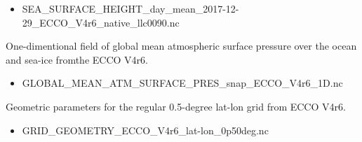 \begin{itemize}
    \item SEA\_SURFACE\_HEIGHT\_day\_mean\_2017-12-29\_ECCO\_V4r6\_native\_llc0090.nc
\end{itemize}

\par One-dimentional field of global mean atmospheric surface pressure over the ocean and sea-ice fromthe ECCO V4r6.
\begin{itemize}
    \item GLOBAL\_MEAN\_ATM\_SURFACE\_PRES\_snap\_ECCO\_V4r6\_1D.nc
\end{itemize}

\par Geometric parameters for the regular 0.5-degree lat-lon grid from ECCO V4r6.
\begin{itemize}
    \item GRID\_GEOMETRY\_ECCO\_V4r6\_lat-lon\_0p50deg.nc
\end{itemize}
